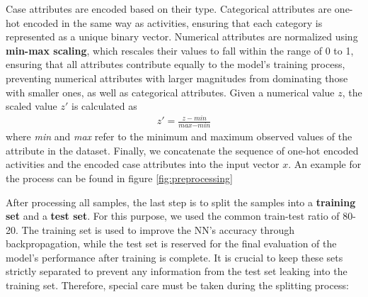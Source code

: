 Case attributes are encoded based on their type.
Categorical attributes are one-hot encoded in the same way as activities,
ensuring that each category is represented as a unique binary vector.
Numerical attributes are normalized using \textbf{min-max scaling},
which rescales their values to fall within the range of 0 to 1,
ensuring that all attributes contribute equally to the model's training process,
preventing numerical attributes with larger magnitudes from dominating those with smaller ones,
as well as categorical attributes.
Given a numerical value $z$, the scaled value $z'$ is calculated as 
\begin{align}
    z' = \frac{z - \textit{min}}{\textit{max} - \textit{min}}
\end{align}
where \textit{min} and \textit{max} refer to the minimum and maximum observed values of the attribute in the dataset.
Finally, we concatenate the sequence of one-hot encoded activities
and the encoded case attributes into the input vector $x$.
An example for the process can be found in figure \ref{fig:preprocessing}

After processing all samples, the last step is to split the samples into a \textbf{training set} and a \textbf{test set}.
For this purpose, we used the common train-test ratio of 80-20.
The training set is used to improve the NN's accuracy through backpropagation,
while the test set is reserved for the final evaluation of the model's performance after training is complete.
It is crucial to keep these sets strictly separated to prevent any information
from the test set leaking into the training set.
Therefore, special care must be taken during the splitting process: \cite{data_split}

